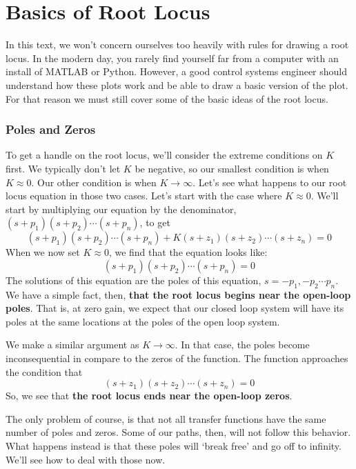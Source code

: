\section{Basics of Root Locus}
In this text, we won't concern ourselves too heavily with rules for drawing a root locus. In the modern day, you rarely find yourself far from a computer with an install of MATLAB or Python. However, a good control systems engineer should understand how these plots work and be able to draw a basic version of the plot. For that reason we must still cover some of the basic ideas of the root locus.

\subsubsection{Poles and Zeros}
To get a handle on the root locus, we'll consider the extreme conditions on $K$ first. We typically don't let $K$ be negative, so our smallest condition is when $K\approx0$. Our other condition is when $K\rightarrow\infty$. Let's see what happens to our root locus equation in those two cases. Let's start with the case where $K\approx0$. We'll start by multiplying our equation by the denominator, $(s+p_1)(s+p_2)\cdots(s+p_n)$, to get
$$(s+p_1)(s+p_2)\cdots(s+p_n)+K(s+z_1)(s+z_2)\cdots(s+z_n)=0$$
When we now set $K\approx0$, we find that the equation looks like:
$$(s+p_1)(s+p_2)\cdots(s+p_n)=0$$
The solutions of this equation are the poles of this equation, $s=-p_1,-p_2\cdots p_n$. We have a simple fact, then, \textbf{that the root locus begins near the open-loop poles}. That is, at zero gain, we expect that our closed loop system will have its poles at the same locations at the poles of the open loop system.

We make a similar argument as $K\rightarrow\infty$. In that case, the poles become inconsequential in compare to the zeros of the function. The function approaches the condition that
$$(s+z_1)(s+z_2)\cdots(s+z_n)=0$$
So, we see that \textbf{the root locus ends near the open-loop zeros}.

The only problem of course, is that not all transfer functions have the same number of poles and zeros. Some of our paths, then, will not follow this behavior. What happens instead is that these poles will `break free' and go off to infinity. We'll see how to deal with those now.

